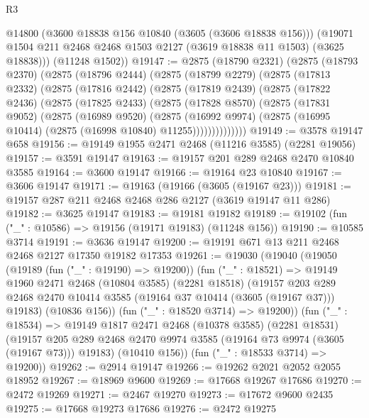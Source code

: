 \begin{lexlean}{R3}
\begin{coremodule}
        @14800
        (@3600 @18838 @156 @10840 (@3605 (@3606 @18838 @156)))
        (@19071 @1504 @211 @2468 @2468 @1503 @2127 (@3619 @18838 @11 @1503) (@3625 @18838)))
      (@11248 @1502))
@19147 := @2875
    (@18790 @2321)
    (@2875
      (@18793 @2370)
      (@2875
        (@18796 @2444)
        (@2875
          (@18799 @2279)
          (@2875
            (@17813 @2332)
            (@2875
              (@17816 @2442)
              (@2875
                (@17819 @2439)
                (@2875
                  (@17822 @2436)
                  (@2875
                    (@17825 @2433)
                    (@2875
                      (@17828 @8570)
                      (@2875
                        (@17831 @9052)
                        (@2875
                          (@16989 @9520)
                          (@2875
                            (@16992 @9974)
                            (@2875 (@16995 @10414) (@2875 (@16998 @10840) @11255))))))))))))))
@19149 := @3578 @19147 @658
@19156 := @19149 @1955 @2471 @2468 (@11216 @3585) (@2281 @19056)
@19157 := @3591 @19147
@19163 := @19157 @201 @289 @2468 @2470 @10840 @3585
@19164 := @3600 @19147
@19166 := @19164 @23 @10840
@19167 := @3606 @19147
@19171 := @19163 (@19166 (@3605 (@19167 @23)))
@19181 := @19157 @287 @211 @2468 @2468 @286 @2127 (@3619 @19147 @11 @286)
@19182 := @3625 @19147
@19183 := @19181 @19182
@19189 := @19102 (fun ("_" : @10586) => @19156 (@19171 @19183) (@11248 @156))
@19190 := @10585 @3714
@19191 := @3636 @19147
@19200 := @19191 @671 @13 @211 @2468 @2468 @2127 @17350 @19182 @17353
@19261 := @19030
    (@19040
      (@19050
        (@19189 (fun ("_" : @19190) => @19200))
        (fun ("_" : @18521) =>
        @19149
          @1960
          @2471
          @2468
          (@10804 @3585)
          (@2281 @18518)
          (@19157
            @203
            @289
            @2468
            @2470
            @10414
            @3585
            (@19164 @37 @10414 (@3605 (@19167 @37)))
            @19183)
          (@10836 @156))
        (fun ("_" : @18520 @3714) => @19200))
      (fun ("_" : @18534) =>
      @19149
        @1817
        @2471
        @2468
        (@10378 @3585)
        (@2281 @18531)
        (@19157 @205 @289 @2468 @2470 @9974 @3585 (@19164 @73 @9974 (@3605 (@19167 @73))) @19183)
        (@10410 @156))
      (fun ("_" : @18533 @3714) => @19200))
@19262 := @2914 @19147
@19266 := @19262 @2021 @2052 @2055 @18952
@19267 := @18969 @9600
@19269 := @17668 @19267 @17686
@19270 := @2472 @19269
@19271 := @2467 @19270
@19273 := @17672 @9600 @2435
@19275 := @17668 @19273 @17686
@19276 := @2472 @19275

\end{coremodule}
\end{lexlean}
